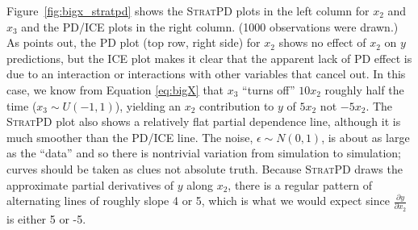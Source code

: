 \documentclass[12pt]{article}
\newcommand{\figref}[1]{Figure~\ref{#1}}
\newcommand{\spd}{\fontfamily{cmr}\textsc{\small StratPD}}
\begin{document}
\noindent \figref{fig:bigx_stratpd} shows the \spd{} plots in the left column for $x_2$ and $x_3$ and the PD/ICE plots in the right column. (1000 observations were drawn.) As \cite{ICE} points out, the PD plot (top row, right side) for $x_2$ shows no effect of $x_2$ on $y$ predictions, but the ICE plot makes it clear that the apparent lack of PD effect is due to an interaction or interactions with other variables that cancel out. In this case, we know from Equation \eqref{eq:bigX} that $x_3$ ``turns off'' $10 x_2$ roughly half the time ($x_3 \sim U(-1,1)$), yielding an $x_2$ contribution to $y$ of $5 x_2$ not $-5 x_2$. The \spd{} plot also shows a relatively flat partial dependence line, although it is much smoother than the PD/ICE line. The noise, $\epsilon \sim N(0,1)$, is about as large as the ``data'' and so there is nontrivial variation from simulation to simulation; curves should be taken as clues not absolute truth. Because \spd{} draws the approximate partial derivatives of $y$ along $x_2$, there is a regular pattern of alternating lines of roughly slope 4 or 5, which is what we would expect since $\frac{\partial y}{\partial x_2}$ is either 5 or -5.
\end{document}
